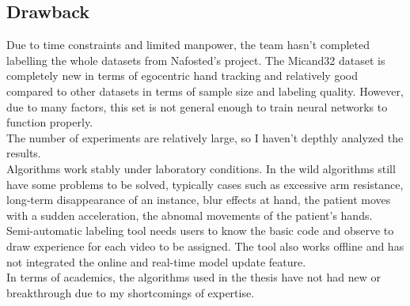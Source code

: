 \subsection{Drawback}
Due to time constraints and limited manpower, the team hasn't completed labelling the whole datasets from Nafosted's project. The Micand32 dataset is completely new in terms of egocentric hand tracking and relatively good compared to other datasets in terms of sample size and labeling quality. However, due to many factors, this set is not general enough to train neural networks to function properly.
\\The number of experiments are relatively large, so I haven’t depthly analyzed the results.
\\Algorithms work stably under laboratory conditions. In the wild algorithms still have some problems to be solved, typically cases such as excessive arm resistance, long-term disappearance of an instance, blur effects at hand, the patient moves with a sudden acceleration, the abnomal movements of the patient’s hands.
\\Semi-automatic labeling tool needs users to know the basic code and observe to draw experience for each video to be assigned. The tool also works offline and has not integrated the online and real-time model update feature.
\\In terms of academics, the algorithms used in the thesis have not had new or breakthrough due to my shortcomings of expertise.

